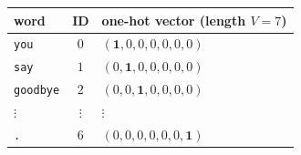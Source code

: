{\renewcommand{\arraystretch}{1.3}%
\begin{tabular}{@{}lcl@{}}
\toprule
word & ID & one-hot vector (length $V=7$) \\
\midrule
\texttt{you}     & $0$ & $(\mathbf{1},0,0,0,0,0,0)$ \\
\texttt{say}     & $1$ & $(0,\mathbf{1},0,0,0,0,0)$ \\
\texttt{goodbye} & $2$ & $(0,0,\mathbf{1},0,0,0,0)$ \\
$\vdots$ & $\vdots$ & \hspace{10mm}$\vdots$ \\
\texttt{.}       & $6$ & $(0,0,0,0,0,0,\mathbf{1})$ \\
\bottomrule
\end{tabular}}
